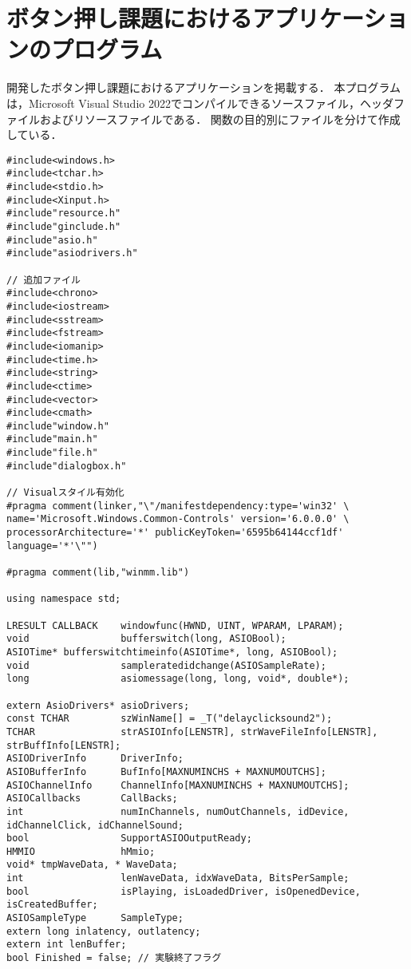 \chapter{ボタン押し課題におけるアプリケーションのプログラム}
開発したボタン押し課題におけるアプリケーションを掲載する．
本プログラムは，Microsoft Visual Studio 2022でコンパイルできるソースファイル，ヘッダファイルおよびリソースファイルである．
関数の目的別にファイルを分けて作成している．

\begin{lstlisting}[caption=main.cpp]
#include<windows.h>
#include<tchar.h>
#include<stdio.h>
#include<Xinput.h>
#include"resource.h"
#include"ginclude.h"
#include"asio.h"
#include"asiodrivers.h"

// 追加ファイル
#include<chrono>
#include<iostream>
#include<sstream>
#include<fstream>
#include<iomanip>
#include<time.h>
#include<string>
#include<ctime>
#include<vector>
#include<cmath>
#include"window.h"
#include"main.h"
#include"file.h"
#include"dialogbox.h"

// Visualスタイル有効化
#pragma comment(linker,"\"/manifestdependency:type='win32' \
name='Microsoft.Windows.Common-Controls' version='6.0.0.0' \
processorArchitecture='*' publicKeyToken='6595b64144ccf1df' language='*'\"")

#pragma comment(lib,"winmm.lib")

using namespace std;

LRESULT CALLBACK	windowfunc(HWND, UINT, WPARAM, LPARAM);
void				bufferswitch(long, ASIOBool);
ASIOTime* bufferswitchtimeinfo(ASIOTime*, long, ASIOBool);
void				sampleratedidchange(ASIOSampleRate);
long				asiomessage(long, long, void*, double*);

extern AsioDrivers* asioDrivers;
const TCHAR			szWinName[] = _T("delayclicksound2");
TCHAR				strASIOInfo[LENSTR], strWaveFileInfo[LENSTR], strBuffInfo[LENSTR];
ASIODriverInfo		DriverInfo;
ASIOBufferInfo		BufInfo[MAXNUMINCHS + MAXNUMOUTCHS];
ASIOChannelInfo		ChannelInfo[MAXNUMINCHS + MAXNUMOUTCHS];
ASIOCallbacks		CallBacks;
int					numInChannels, numOutChannels, idDevice, idChannelClick, idChannelSound;
bool				SupportASIOOutputReady;
HMMIO				hMmio;
void* tmpWaveData, * WaveData;
int					lenWaveData, idxWaveData, BitsPerSample;
bool				isPlaying, isLoadedDriver, isOpenedDevice, isCreatedBuffer;
ASIOSampleType		SampleType;
extern long inlatency, outlatency;
extern int lenBuffer;
bool Finished = false; // 実験終了フラグ


\end{lstlisting}
